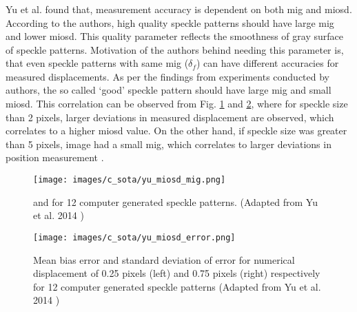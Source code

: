     \subsubsection{}
        Yu et al. found that, measurement accuracy is dependent on both \gls{mig} and \gls{miosd}. According to the authors, high quality speckle patterns should have large \gls{mig} and lower \gls{miosd}. This quality parameter reflects the smoothness of gray surface of speckle patterns. Motivation of the authors behind needing this parameter is, that even speckle patterns with same \gls{mig} ($\delta_f$) can have different accuracies for measured displacements. As per the findings from experiments conducted by authors, the so called `good' speckle pattern should have large \gls{mig} and small \gls{miosd}. This correlation can be observed from Fig. \ref{fig:yu_miosd_mig.png} and \ref{fig:yu_miosd_error.png}, where for speckle size than 2 pixels, larger deviations in measured displacement are observed, which correlates to a higher \gls{miosd} value. On the other hand, if speckle size was greater than 5 pixels, image had a small \gls{mig}, which correlates to larger deviations in position measurement \cite{yu_miosd}.

        \begin{figure}[ht] 
            \centering
            \texttt{[image: images/c\_sota/yu\_miosd\_mig.png]}
            \caption{ and  for 12 computer generated speckle patterns. (Adapted from Yu et al. 2014 \cite{yu_miosd})}
            \label{fig:yu_miosd_mig.png}
        \end{figure}

        \begin{figure}[ht] 
            \centering
            \texttt{[image: images/c\_sota/yu\_miosd\_error.png]}
            \caption{Mean bias error and standard deviation of error for numerical displacement of 0.25 pixels (left) and 0.75 pixels (right) respectively for 12 computer generated speckle patterns (Adapted from Yu et al. 2014 \cite{yu_miosd})}
            \label{fig:yu_miosd_error.png}
        \end{figure}
    

